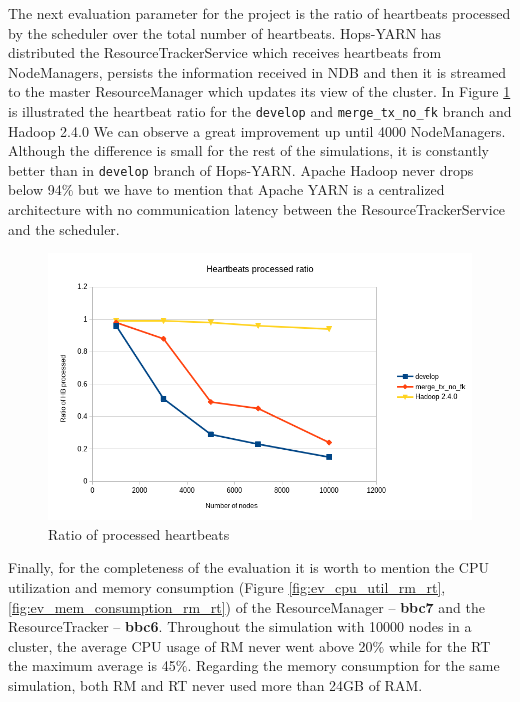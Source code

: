 The next evaluation parameter for the project is the ratio of
heartbeats processed by the scheduler over the total number of
heartbeats. Hops-YARN has distributed the ResourceTrackerService which
receives heartbeats from NodeManagers, persists the information
received in NDB and then it is streamed to the master ResourceManager
which updates its view of the cluster. In Figure
\ref{fig:ev_hb_processed_final} is illustrated the heartbeat ratio for
the \texttt{develop} and \texttt{merge\_tx\_no\_fk} branch and Hadoop
2.4.0 We can observe a great improvement up until 4000
NodeManagers. Although the difference is small for the rest of the
simulations, it is constantly better than in \texttt{develop} branch
of Hops-YARN. Apache Hadoop never drops below 94$\%$ but we have to
mention that Apache YARN is a centralized architecture with no
communication latency between the ResourceTrackerService and the scheduler.

\begin{figure}
\centering
\includegraphics[scale=0.7]{resources/images/Evaluation/hb_processed_final.png}
\caption{Ratio of processed heartbeats}
\label{fig:ev_hb_processed_final}
\end{figure}

Finally, for the completeness of the evaluation it is worth to mention the
CPU utilization and memory
consumption (Figure  \ref{fig:ev_cpu_util_rm_rt}, \ref{fig:ev_mem_consumption_rm_rt}) of the
ResourceManager -- \textbf{bbc7} and the
ResourceTracker -- \textbf{bbc6}. Throughout the simulation with 10000 nodes in a
cluster, the average CPU usage of RM never went above 20$\%$ while for
the RT the maximum average is 45$\%$. Regarding the memory consumption
for the same simulation, both RM and RT never used more than 24GB of RAM.

